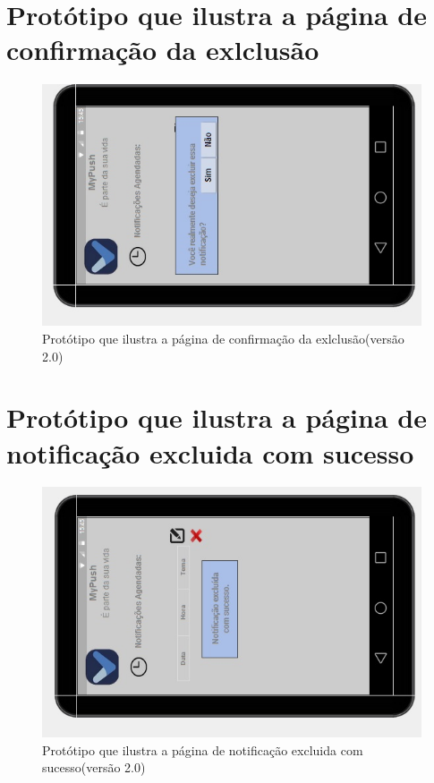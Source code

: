 \begin{apendicesenv}
    \pagebreak
      \section*{Protótipo que ilustra a página de confirmação da exlclusão}

    \begin{figure}[!htbp]
      \centering
      \includegraphics[scale=0.9, angle=-90]{editaveis/figuras/prototipo_alta_fidelidade_v2/2_11}
      \caption{Protótipo que ilustra a página de confirmação da exlclusão(versão 2.0)}
      \label{v2}
    \end{figure}
    
    \pagebreak
      \section*{Protótipo que ilustra a página de notificação excluida com sucesso}

    \begin{figure}[!htbp]
      \centering
      \includegraphics[scale=0.9, angle=-90]{editaveis/figuras/prototipo_alta_fidelidade_v2/2_12}
      \caption{Protótipo que ilustra a página de notificação excluida com sucesso(versão 2.0)}
      \label{v2}
    \end{figure}
    

\end{apendicesenv}
